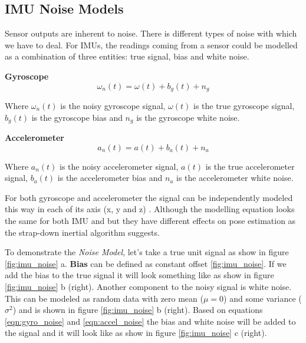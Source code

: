 \subsection{IMU Noise Models}
Sensor outputs are inherent to noise. There is different types of noise with which we have to deal. For IMUs, the readings coming from a sensor could be modelled as a combination of three entities: true signal, bias and white noise.

\textbf{Gyroscope}
\begin{equation}
    \omega_{n}(t) = \omega(t) + b_{g}(t) + n_{g}
\label{eqn:gyro_noise}
\end{equation}

Where $ \omega_{n}(t) $ is the noisy gyroscope signal, $ \omega(t) $ is the true gyroscope signal, $ b_{g}(t) $ is the gyroscope bias and $ n_{g} $ is the gyroscope white noise.

\textbf{Accelerometer}
\begin{equation}
    a_{n}(t) = a(t) + b_{a}(t) + n_{a}
\label{eqn:accel_noise}
\end{equation}

Where $ a_{n}(t) $ is the noisy accelerometer signal, $ a(t) $ is the true accelerometer signal, $ b_{a}(t) $ is the accelerometer bias and $ n_{a} $ is the accelerometer white noise.

For both gyroscope and accelerometer the signal can be independently modeled this way in each of its axis (x, y and z) \citep{imu_noise}. Although the modelling equation looks the same for both IMU and but they have different effects on pose estimation as the strap-down inertial algorithm suggests.

To demonstrate the \textit{Noise Model}, let's take a true unit signal as show in figure \ref{fig:imu_noise} a. \textbf{Bias} can be defined as constant offset \ref{fig:imu_noise}. If we add the bias to the true signal it will look something like as show in figure \ref{fig:imu_noise} b (right). Another component to the noisy signal is white noise. This can be modeled as random data with zero mean ($ \mu = 0 $) and some variance ($ \sigma^{2} $) and is shown in figure \ref{fig:imu_noise} b (right). Based on equations \ref{eqn:gyro_noise} and \ref{eqn:accel_noise} the bias and white noise will be added to the signal and it will look like as show in figure \ref{fig:imu_noise} c (right). 

